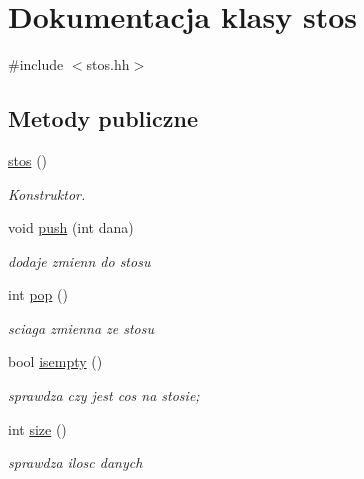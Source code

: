 \hypertarget{classstos}{\section{\-Dokumentacja klasy stos}
\label{classstos}
}


{\ttfamily \#include $<$stos.\-hh$>$}

\subsection*{\-Metody publiczne}
\begin{DoxyCompactItemize}
\item 
\hyperlink{classstos_afb387ac69250038334f6d8099b6a2421}{stos} ()
\begin{DoxyCompactList}\small\item\em \-Konstruktor. \end{DoxyCompactList}\item 
void \hyperlink{classstos_a501f0a03fece3b29c32939355cd46154}{push} (int dana)
\begin{DoxyCompactList}\small\item\em dodaje zmienn do stosu \end{DoxyCompactList}\item 
int \hyperlink{classstos_a809ccf5ceabaa74dbd7c84c78102cded}{pop} ()
\begin{DoxyCompactList}\small\item\em sciaga zmienna ze stosu \end{DoxyCompactList}\item 
bool \hyperlink{classstos_a28f9b17c72b4a91221e4bae54e169895}{isempty} ()
\begin{DoxyCompactList}\small\item\em sprawdza czy jest cos na stosie; \end{DoxyCompactList}\item 
int \hyperlink{classstos_a47fcfe525e580ceb48080b33ab3d53de}{size} ()
\begin{DoxyCompactList}\small\item\em sprawdza ilosc danych \end{DoxyCompactList}\end{DoxyCompactItemize}
